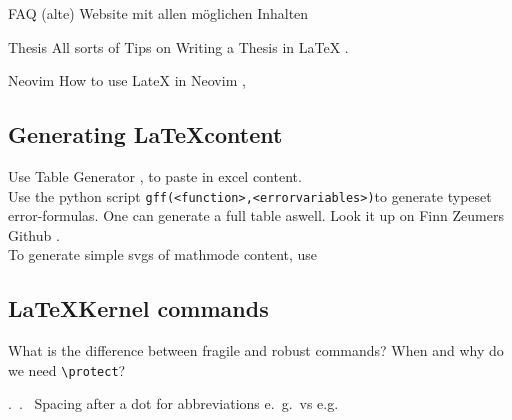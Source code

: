 

\begin{macro}{FAQ}
  (alte) Website mit allen möglichen Inhalten 
\end{macro}

\begin{macro}{Thesis}
  All sorts of Tips on Writing a Thesis in LaTeX .
\end{macro}

\begin{macro}{Neovim}
  How to use LateX in Neovim , 
\end{macro}

\subsection{Generating \LaTeX content}
Use Table Generator , to paste in excel content.\\ 
Use the python script \verb|gff(<function>,<errorvariables>)|to generate typeset error-formulas. One can generate a full table aswell. Look it up on Finn Zeumers Github .\\
To generate simple svgs of mathmode content, use 

\subsection{\LaTeX Kernel commands}
\begin{macro}{\protect}
  What is the difference between fragile and robust commands? When and why do we need \verb|\protect|? 
\end{macro}

\begin{macro}{.\ \@ .\ }
  Spacing after a dot for abbreviations e.\ g.\ vs e.g.  
\end{macro}

